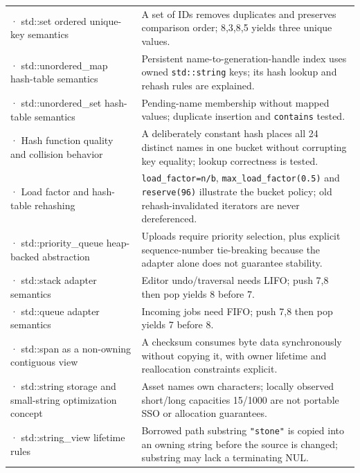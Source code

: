 {\begin{longtable}[]{@{}
  >{\raggedright\arraybackslash}p{}
  >{\raggedright\arraybackslash}p{}@{}}
240 · std::set ordered unique-key semantics & A set of IDs removes duplicates and preserves comparison order; 8,3,8,5 yields three unique values. \\
241 · std::unordered\_map hash-table semantics & Persistent name-to-generation-handle index uses owned \texttt{std::string} keys; its hash lookup and rehash rules are explained. \\
242 · std::unordered\_set hash-table semantics & Pending-name membership without mapped values; duplicate insertion and \texttt{contains} tested. \\
243 · Hash function quality and collision behavior & A deliberately constant hash places all 24 distinct names in one bucket without corrupting key equality; lookup correctness is tested. \\
244 · Load factor and hash-table rehashing & \texttt{load\_factor=n/b}, \texttt{max\_load\_factor(0.5)} and \texttt{reserve(96)} illustrate the bucket policy; old rehash-invalidated iterators are never dereferenced. \\
245 · std::priority\_queue heap-backed abstraction & Uploads require priority selection, plus explicit sequence-number tie-breaking because the adapter alone does not guarantee stability. \\
246 · std::stack adapter semantics & Editor undo/traversal needs LIFO; push 7,8 then pop yields 8 before 7. \\
247 · std::queue adapter semantics & Incoming jobs need FIFO; push 7,8 then pop yields 7 before 8. \\
248 · std::span as a non-owning contiguous view & A checksum consumes byte data synchronously without copying it, with owner lifetime and reallocation constraints explicit. \\
249 · std::string storage and small-string optimization concept & Asset names own characters; locally observed short/long capacities 15/1000 are not portable SSO or allocation guarantees. \\
250 · std::string\_view lifetime rules & Borrowed path substring \texttt{"stone"} is copied into an owning string before the source is changed; substring may lack a terminating NUL. \\
\end{longtable}
}

